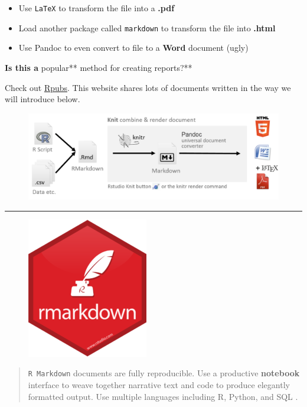 \documentclass[]{book}
\theoremstyle{definition}
\theoremstyle{definition}
\theoremstyle{definition}
\theoremstyle{remark}
\begin{document}
\begin{itemize}
\item
  Use \texttt{LaTeX} to transform the file into a \textbf{.pdf}
\item
  Load another package called \texttt{markdown} to transform the file
  into \textbf{.html}
\item
  Use Pandoc to even convert to file to a \textbf{Word} document (ugly)
\end{itemize}

\textbf{Is this a }popular** method for creating reports?**

Check out \href{http://rpubs.com/}{Rpubs}. This website shares lots of
documents written in the way we will introduce below.

\begin{figure}
\centering
\includegraphics{img/processRStudio.png}
\caption{}
\end{figure}

\begin{center}\rule{0.5\linewidth}{\linethickness}\end{center}

\begin{figure}
\centering
\includegraphics{img/hex/rmarkdown-200x232.png}
\caption{}
\end{figure}

\begin{quote}
\texttt{R\ Markdown} documents are fully reproducible. Use a productive
\textbf{notebook} interface to weave together narrative text and code to
produce elegantly formatted output. Use multiple languages including R,
Python, and SQL \citep{R-rmarkdown}.
\end{quote}
\end{document}
